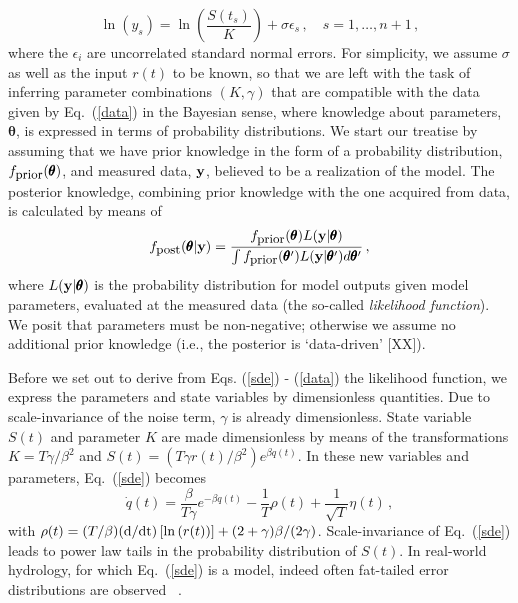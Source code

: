 \documentclass[11pt]{article}
\newcommand{\vc}[1]{{\bf #1 }}
\theoremstyle{definition}
\newcommand{\bt}{\pmb\theta}
\begin{document}
\begin{equation}\label{data}
  \ln \left( y_s \right)
  =
  \ln \left( \frac{S(t_s)}{K} \right)
  +
  \sigma\epsilon_s\,,\quad s=1,\dots,n+1\,,
\end{equation}
where the $\epsilon_i$ are uncorrelated standard normal errors.
For simplicity, we assume $\sigma$ as well as the input $r(t)$ to be known, so that we are left with the task of inferring parameter combinations $(K,\gamma)$ that are compatible with the data given by Eq.~(\ref{data}) in the Bayesian sense, where knowledge about parameters, $\bt$, is expressed in terms of probability distributions.
We start our treatise by assuming that we have prior knowledge in the form of a probability distribution, $f_{\mbox{\small prior}}(\bt)$, and measured data, $\vc y$, believed to be a realization of the model.
The posterior knowledge, combining prior knowledge with the one acquired from data, is calculated by means of 
\begin{equation}\label{Bayes}
  f_{\mbox{\small post}}(\bt|\vc y)
  =
  \frac{f_{\mbox{\small prior}}(\bt)L(\vc y|\bt)}
  {\int f_{\mbox{\small prior}}(\bt')L(\vc y|\bt')d\bt'}\,,
\end{equation}
where $L(\vc y|\bt)$ is the probability distribution for model outputs given model parameters, evaluated at the measured data (the so-called {\em likelihood function}).
We posit that parameters must be non-negative; otherwise we assume no additional prior knowledge (i.e., the posterior is ‘data-driven’ [XX]).

Before we set out to derive from Eqs. (\ref{sde}) - (\ref{data}) the likelihood function, we express the parameters and state variables by dimensionless quantities.
Due to scale-invariance of the noise term, $\gamma$ is already dimensionless. State variable $S(t)$ and parameter $K$ are made dimensionless by means of the transformations $K=T\gamma/\beta^2$ and $S(t)=(T\gamma r(t)/\beta^2)e^{\beta q(t)}$.
In these new variables and parameters, Eq.~(\ref{sde}) becomes
\begin{equation}
  \dot q(t)
  =
  \frac{\beta}{T\gamma}e^{-\beta q(t)}
  -
  \frac{1}{T}\rho(t)
  +
  \frac{1}{\sqrt{T}}\eta(t)\,,
\end{equation}
with $\rho(t)  =  (T/\beta)(\mbox d/\mbox{dt})\left[ \ln \left( r(t) \right) \right]
  +
  (2+\gamma)\beta/(2\gamma)$.
Scale-invariance of Eq.~(\ref{sde}) leads to power law tails in the probability distribution of $S(t)$. In real-world hydrology, for which Eq.~(\ref{sde}) is a model, indeed often fat-tailed error distributions are observed ~\cite{thyer_2009_fattails}.
\end{document}
